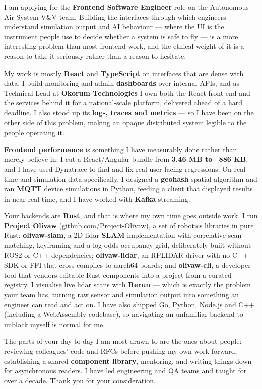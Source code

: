 \documentclass[11pt,a4paper]{awesome-cv}
\begin{document}
\makecvheader[R]
\makelettertitle

\begin{cvletter}

I am applying for the \textbf{Frontend Software Engineer} role on the Autonomous Air System V\&V team. Building the interfaces through which engineers understand simulation output and AI behaviour --- where the UI is the instrument people use to decide whether a system is safe to fly --- is a more interesting problem than most frontend work, and the ethical weight of it is a reason to take it seriously rather than a reason to hesitate.

My work is mostly \textbf{React} and \textbf{TypeScript} on interfaces that are dense with data. I build monitoring and admin \textbf{dashboards} over internal APIs, and as Technical Lead at \textbf{Okorum Technologies} I own both the React front end and the services behind it for a national-scale platform, delivered ahead of a hard deadline. I also stood up its \textbf{logs, traces and metrics} --- so I have been on the other side of this problem, making an opaque distributed system legible to the people operating it.

\textbf{Frontend performance} is something I have measurably done rather than merely believe in: I cut a React/Angular bundle from \textbf{3.46 MB to ~886 KB}, and I have used Dynatrace to find and fix real user-facing regressions. On real-time and simulation data specifically, I designed a \textbf{geohash} spatial algorithm and ran \textbf{MQTT} device simulations in Python, feeding a client that displayed results in near real time, and I have worked with \textbf{Kafka} streaming.

Your backends are \textbf{Rust}, and that is where my own time goes outside work. I run \textbf{Project Olivaw} (github.com/Project-Olivaw), a set of robotics libraries in pure Rust: \textbf{olivaw-slam}, a 2D lidar \textbf{SLAM} implementation with correlative scan matching, keyframing and a log-odds occupancy grid, deliberately built without ROS2 or C++ dependencies; \textbf{olivaw-lidar}, an RPLIDAR driver with no C++ SDK or FFI that cross-compiles to aarch64 boards; and \textbf{olivaw-cli}, a developer tool that vendors editable Rust components into a project from a curated registry. I visualise live lidar scans with \textbf{Rerun} --- which is exactly the problem your team has, turning raw sensor and simulation output into something an engineer can read and act on. I have also shipped Go, Python, Node.js and C++ (including a WebAssembly codebase), so navigating an unfamiliar backend to unblock myself is normal for me.

The parts of your day-to-day I am most drawn to are the ones about people: reviewing colleagues' code and RFCs before pushing my own work forward, establishing a shared \textbf{component library}, mentoring, and writing things down for asynchronous readers. I have led engineering and QA teams and taught for over a decade. Thank you for your consideration.

\end{cvletter}

\makeletterclosing
\end{document}
